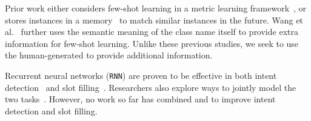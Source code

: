 Prior work either considers few-shot learning in a metric learning framework~\cite{koch2015siamese,vinyals2016matching}, or stores
instances in a memory~\cite{santoro2016meta, kaiser2017learning} to match similar instances in the future.
Wang et al.~ further uses the semantic meaning of the class name itself to provide extra information for few-shot
learning. Unlike these previous studies, we seek to use the human-generated \REs to provide additional information.

Recurrent neural networks (\texttt{RNN}) are proven to be effective in both intent detection~\cite{ravuri2015comparative} and slot filling~\cite{mesnil2015using}.
Researchers also explore ways to jointly model the two tasks~\cite{liu2016attention, zhang2016joint}. However, no work so far has combined
\REs and \NNs to improve intent detection and slot filling. %
